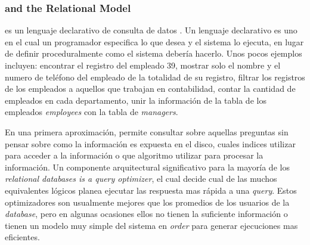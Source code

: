 \subsubsection{ and the Relational Model}

 es un lenguaje declarativo de consulta de datos . Un lenguaje declarativo es uno en el cual un programador especifica lo que desea y el sistema lo ejecuta, en lugar de definir proceduralmente como el sistema debería hacerlo. Unos pocos ejemplos incluyen: encontrar el registro del empleado 39, mostrar solo el nombre y el numero de teléfono del empleado de la totalidad de su registro, filtrar los registros de los empleados a aquellos que trabajan en contabilidad, contar la cantidad de empleados en cada departamento, unir la información de la tabla de los empleados \textit{employees} con la tabla de \textit{managers}.


En una primera aproximación,  permite consultar sobre aquellas preguntas sin pensar sobre como la información es expuesta en el disco, cuales indices utilizar para acceder a la información o que algoritmo utilizar para procesar la información. Un componente arquitectural significativo para la mayoría de los \textit{relational databases is a query optimizer}, el cual decide cual de las muchos equivalentes lógicos planea ejecutar las respuesta mas rápida a una \textit{query}. Estos optimizadores son usualmente mejores que los promedios de los usuarios de la \textit{database}, pero en algunas ocasiones ellos no tienen la suficiente información o tienen un modelo muy simple del sistema en \textit{order} para generar ejecuciones mas eficientes.


